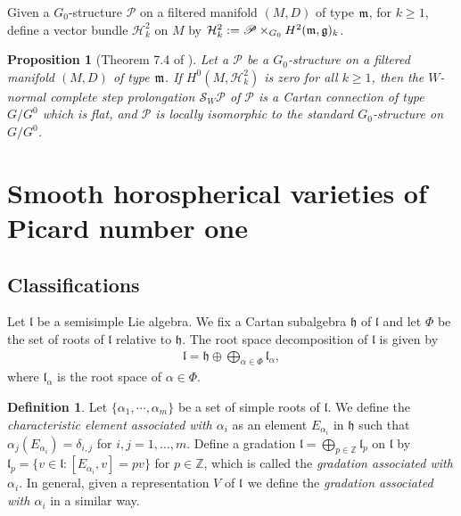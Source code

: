 \documentclass[12pt]{amsart}
\theoremstyle{plain}
\newtheorem{proposition}[theorem]{Proposition}
\theoremstyle{definition}
\newtheorem{definition} [theorem] {Definition}
\begin{document}
Given a $G_0$-structure $\mathscr P$ on a filtered manifold  $(M,D)$  of type $\frak m$, for $k \geq 1$,  define a vector bundle $\mathcal H^2_k$ on $M$  by  $\mathcal H^2_k:=\mathscr P \times _{G_0} H^2(\frak m, \frak g)_k$. %

\begin{proposition} [Theorem 7.4 of \cite{HM}] \label{prop:prolongation methods} Let a $\mathscr P$ be a $G_0$-structure on a filtered manifold  $(M,D)$  of type $\frak m$.
  If  $H^0(M, \mathcal H^2_k)$ is zero for all $k \geq 1$, then the $W$-normal complete step  prolongation  $\mathscr S_W \mathscr P $ of $\mathscr P$ is a Cartan connection of type $G/G^0$ which is flat, and $\mathscr P$ is locally isomorphic to the standard $G_0$-structure on $G/G^0$.
\end{proposition}




\section{Smooth horospherical varieties of Picard number one} \label{horospherical varieties}

\subsection{Classifications}

Let $\mathfrak l$ be a semisimple Lie algebra. We fix a Cartan subalgebra $\mathfrak h$ of $\mathfrak l$ and let $\Phi$ be the set of roots of $\mathfrak l$ relative to $\mathfrak h$. The root space decomposition of $\mathfrak l$ is given by
 \begin{eqnarray*} \mathfrak l =\mathfrak h \oplus \bigoplus_{\alpha \in \Phi} \mathfrak l_{\alpha}, \end{eqnarray*}
where $\mathfrak l_{\alpha}
$ is the root space of $\alpha \in \Phi$.

\begin{definition}
Let $\{\alpha_1, \cdots, \alpha_m \}$ be a set of simple roots of $\mathfrak l$. We define the \emph{characteristic element  associated with $\alpha_i$} as an element $E_{\alpha_i}$ in $\mathfrak h$ such that $\alpha_j(E_{\alpha_i})= \delta_{i,j}$ for $i,j=1, \dots, m$. Define a gradation $\mathfrak l=\bigoplus_{p\in \mathbb Z} \mathfrak l_p$  on $\mathfrak l$ by $\mathfrak l_p = \{ v \in \mathfrak l : [E_{\alpha_i}, v] = p v\}$  for $p \in \mathbb Z$, which is called the \emph{gradation associated with $\alpha_i$}. In general, given a representation $V$ of $\frak l$ we define the \emph{gradation associated with $\alpha_i$} in a similar way.
\end{definition}
\end{document}
